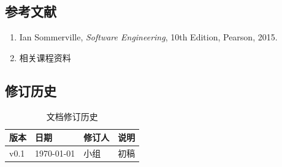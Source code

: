\documentclass[12pt,a4paper]{ctexart}
\begin{document}
\subsection{参考文献}
\begin{enumerate}
    \item Ian Sommerville, \textit{Software Engineering}, 10th Edition, Pearson, 2015.
    \item 相关课程资料
\end{enumerate}

\subsection{修订历史}
\begin{table}[H]
\centering
\caption{文档修订历史}
\begin{tabular}{llll}
\toprule
\textbf{版本} & \textbf{日期} & \textbf{修订人} & \textbf{说明} \\
\midrule
v0.1 & \today & 小组 & 初稿 \\
\bottomrule
\end{tabular}
\end{table}
\end{document}
